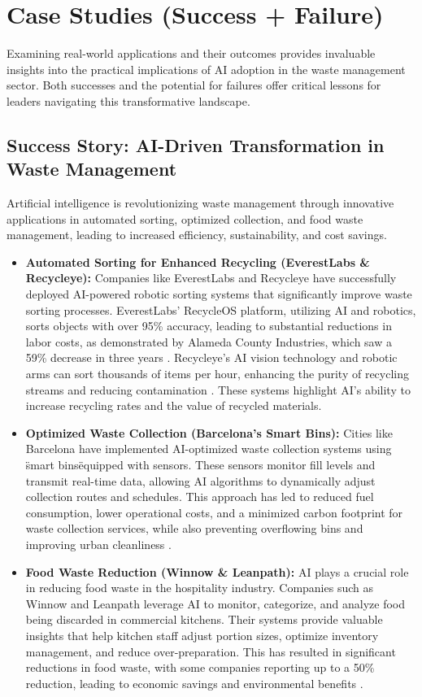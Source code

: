 \section{Case Studies (Success + Failure)}

Examining real-world applications and their outcomes provides invaluable insights into the practical implications of AI adoption in the waste management sector. Both successes and the potential for failures offer critical lessons for leaders navigating this transformative landscape.

\subsection{Success Story: AI-Driven Transformation in Waste Management}
Artificial intelligence is revolutionizing waste management through innovative applications in automated sorting, optimized collection, and food waste management, leading to increased efficiency, sustainability, and cost savings.
\begin{itemize}
    \item \textbf{Automated Sorting for Enhanced Recycling (EverestLabs \& Recycleye):}
Companies like EverestLabs and Recycleye have successfully deployed AI-powered robotic sorting systems that significantly improve waste sorting processes. EverestLabs' RecycleOS platform, utilizing AI and robotics, sorts objects with over 95\% accuracy, leading to substantial reductions in labor costs, as demonstrated by Alameda County Industries, which saw a 59\% decrease in three years \cite{Forbes_Success}. Recycleye's AI vision technology and robotic arms can sort thousands of items per hour, enhancing the purity of recycling streams and reducing contamination \cite{Recycleye_Success_1, Recycleye_Success_2}. These systems highlight AI's ability to increase recycling rates and the value of recycled materials.
    \item \textbf{Optimized Waste Collection (Barcelona's Smart Bins):}
Cities like Barcelona have implemented AI-optimized waste collection systems using \"smart bins\" equipped with sensors. These sensors monitor fill levels and transmit real-time data, allowing AI algorithms to dynamically adjust collection routes and schedules. This approach has led to reduced fuel consumption, lower operational costs, and a minimized carbon footprint for waste collection services, while also preventing overflowing bins and improving urban cleanliness \cite{BlueSkyCreations_Success, NIH_Success}.
    \item \textbf{Food Waste Reduction (Winnow \& Leanpath):}
AI plays a crucial role in reducing food waste in the hospitality industry. Companies such as Winnow and Leanpath leverage AI to monitor, categorize, and analyze food being discarded in commercial kitchens. Their systems provide valuable insights that help kitchen staff adjust portion sizes, optimize inventory management, and reduce over-preparation. This has resulted in significant reductions in food waste, with some companies reporting up to a 50\% reduction, leading to economic savings and environmental benefits \cite{WinnowSolutions_Success, Aim2Flourish_Success}.
\end{itemize}
